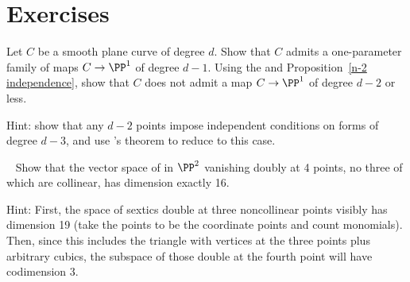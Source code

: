 \section{Exercises}

\begin{exercise}\label{gonality of smooth plane curve}
Let $C$ be a smooth plane curve of degree $d$. Show that $C$ admits a
one-parameter family of maps $C \to \PP^1$ of degree $d-1$. Using the
%
and Proposition~\ref{n-2 independence}, show
that $C$ does not admit a map $C \to \PP^1$ of degree $d-2$ or less.  

Hint: show that any $d-2$ points impose independent conditions on
forms of degree $d-3$, and use 
's theorem
%
to reduce to this case.
\end{exercise}

\begin{exercise}~\label{double vanishing at 4 points}
Show that the vector space of 
%
in $\PP^2$ vanishing doubly at 4 points, no three of which are
collinear,  has dimension
exactly 16.

Hint: First, the space of sextics double at three noncollinear points visibly has dimension 19 (take the points to be the coordinate points and count monomials). Then, since this includes the triangle with vertices at the three points plus arbitrary cubics, the subspace of those double at the fourth point will have codimension 3.
\end{exercise}

